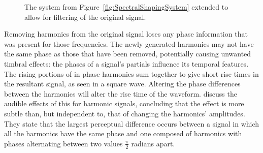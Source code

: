 \begin{figure}[h!]
			\caption{The system from Figure~\ref{fig:SpectralShapingSystem} extended to allow for filtering of
				 the original signal.}
			\label{fig:SuperpositionSystem}
		\end{figure}

		Removing harmonics from the original signal loses any phase information that was present for those
		frequencies. The newly generated harmonics may not have the same phase as those that have been removed,
		potentially causing unwanted timbral effects: the phases of a signal's partials influence its temporal
		features. The rising portions of in phase harmonics sum together to give short rise times in the resultant
		signal, as seen in a square wave. Altering the phase differences between the harmonics will alter the rise
		time of the waveform. \citet{plomp1969effect} discuss the audible effects of this for harmonic signals,
		concluding that the effect is more subtle than, but independent to, that of changing the harmonics'
		amplitudes. They state that the largest perceptual difference occurs between a signal in which all the
		harmonics have the same phase and one composed of harmonics with phases alternating between two values
		$\frac{\pi}{2}$ radians apart.

